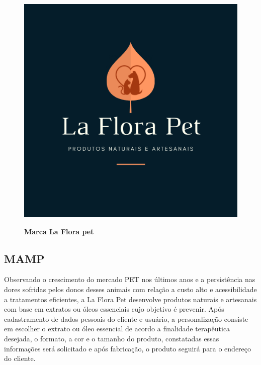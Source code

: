 \begin{figure}[H]
\centering
\caption{\textbf{Marca La Flora pet}}
\includegraphics[scale=5]{Imagens/laflorapet.png}
\label{figura_24}
\end{figure}


\subsection{MAMP}

Observando o crescimento do mercado PET nos últimos anos e a persistência nas dores sofridas pelos donos desses animais com relação a custo alto e acessibilidade a tratamentos eficientes, a La Flora Pet desenvolve produtos naturais e artesanais com base em extratos ou óleos essenciais cujo objetivo é prevenir. Após cadastramento de dados pessoais do cliente e usuário, a personalização consiste em escolher o extrato ou óleo essencial de acordo a finalidade terapêutica desejada, o formato, a cor e o tamanho do produto, constatadas essas informações será solicitado e após fabricação, o produto seguirá para o endereço do cliente.

